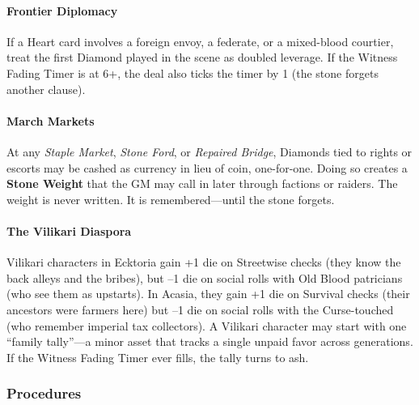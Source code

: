 \paragraph{Frontier Diplomacy}
If a Heart card involves a foreign envoy, a federate, or a mixed-blood courtier, treat the first Diamond played in the scene as doubled leverage. If the Witness Fading Timer is at 6+, the deal also ticks the timer by 1 (the stone forgets another clause).

\paragraph{March Markets}
At any \emph{Staple Market}, \emph{Stone Ford}, or \emph{Repaired Bridge}, Diamonds tied to rights or escorts may be cashed as currency in lieu of coin, one-for-one. Doing so creates a \textbf{Stone Weight} that the GM may call in later through factions or raiders. The weight is never written. It is remembered---until the stone forgets.

\paragraph{The Vilikari Diaspora}
Vilikari characters in Ecktoria gain +1 die on Streetwise checks (they know the back alleys and the bribes), but --1 die on social rolls with Old Blood patricians (who see them as upstarts). In Acasia, they gain +1 die on Survival checks (their ancestors were farmers here) but --1 die on social rolls with the Curse-touched (who remember imperial tax collectors). A Vilikari character may start with one ``family tally''---a minor asset that tracks a single unpaid favor across generations. If the Witness Fading Timer ever fills, the tally turns to ash.

\subsubsection{Procedures}

